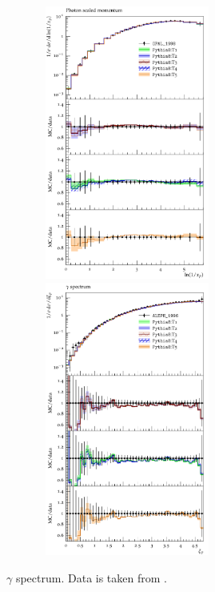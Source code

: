 \documentclass[aps,preprint,floatfix,nofootinbib,showpacs]{revtex4-1}
\begin{document}
 
 \begin{figure}[btp]
  \centering
   \includegraphics[width=8cm, height=9cm]{OPAL_1998/d03-x01-y01.pdf}
 \hfill
  \includegraphics[width=8cm, height=9cm]{ALEPH_1996/d28-x01-y01.pdf}
  \caption{$\gamma$ spectrum. Data is taken from \cite{Barate:1996fi, Ackerstaff:1998ap}.}
  \label{Fig-8}
 \end{figure}



\clearpage
\appendix
\end{document}
